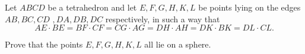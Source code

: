 Let $ABCD$ be a tetrahedron and let $E,F,G,H,K,L$ be points lying on the edges $AB,BC,CD$ $,DA,DB,DC$ respectively, in such a way that\[AE \cdot BE = BF \cdot CF = CG \cdot AG= DH \cdot AH=DK \cdot BK=DL \cdot CL.\]

Prove that the points $E,F,G,H,K,L$ all lie on a sphere.